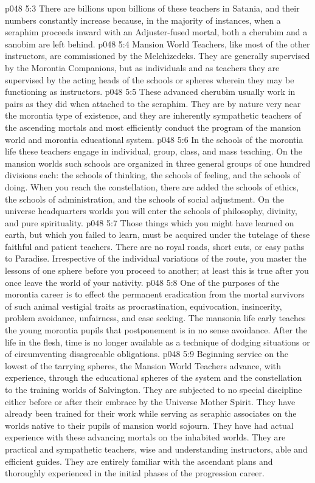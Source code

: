 \vs p048 5:3 There are billions upon billions of these teachers in Satania, and their numbers constantly increase because, in the majority of instances, when a seraphim proceeds inward with an Adjuster\hyp{}fused mortal, both a cherubim and a sanobim are left behind.\plusone
\pc \vs p048 5:4 Mansion World Teachers, like most of the other instructors, are commissioned by the Melchizedeks. They are generally supervised by the Morontia Companions, but as individuals and as teachers they are supervised by the acting heads of the schools or spheres wherein they may be functioning as instructors.
\vs p048 5:5 These advanced cherubim usually work in pairs as they did when attached to the seraphim. They are by nature very near the morontia type of existence, and they are inherently sympathetic teachers of the ascending mortals and most efficiently conduct the program of the mansion world and morontia educational system.
\vs p048 5:6 In the schools of the morontia life these teachers engage in individual, group, class, and mass teaching. On the mansion worlds such schools are organized in three general groups of one hundred divisions each: the schools of thinking, the schools of feeling, and the schools of doing. When you reach the constellation, there are added the schools of ethics, the schools of administration, and the schools of social adjustment. On the universe headquarters worlds you will enter the schools of philosophy, divinity, and pure spirituality.
\pc \vs p048 5:7 Those things which you might have learned on earth, but which you failed to learn, must be acquired under the tutelage of these faithful and patient teachers. There are no royal roads, short cuts, or easy paths to Paradise. Irrespective of the individual variations of the route, you master the lessons of one sphere before you proceed to another; at least this is true after you once leave the world of your nativity.
\vs p048 5:8 One of the purposes of the morontia career is to effect the permanent eradication from the mortal survivors of such animal vestigial traits as procrastination, equivocation, insincerity, problem avoidance, unfairness, and ease seeking. The mansonia life early teaches the young morontia pupils that postponement is in no sense avoidance. After the life in the flesh, time is no longer available as a technique of dodging situations or of circumventing disagreeable obligations.
\pc \vs p048 5:9 Beginning service on the lowest of the tarrying spheres, the Mansion World Teachers advance, with experience, through the educational spheres of the system and the constellation to the training worlds of Salvington. They are subjected to no special discipline either before or after their embrace by the Universe Mother Spirit. They have already been trained for their work while serving as seraphic associates on the worlds native to their pupils of mansion world sojourn. They have had actual experience with these advancing mortals on the inhabited worlds. They are practical and sympathetic teachers, wise and understanding instructors, able and efficient guides. They are entirely familiar with the ascendant plans and thoroughly experienced in the initial phases of the progression career.
